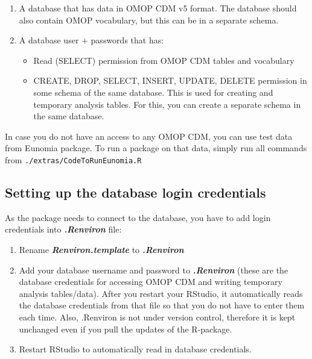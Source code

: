 \documentclass[
]{article}
\providecommand{\tightlist}{%
  \setlength{\itemsep}{0pt}\setlength{\parskip}{0pt}}
\begin{document}
\begin{enumerate}
\def\labelenumi{\arabic{enumi}.}
\tightlist
\item
  A database that has data in OMOP CDM v5 format. The database should
  also contain OMOP vocabulary, but this can be in a separate schema.
\item
  A database user + passwords that has:

  \begin{itemize}
  \tightlist
  \item
    Read (SELECT) permission from OMOP CDM tables and vocabulary
  \item
    CREATE, DROP, SELECT, INSERT, UPDATE, DELETE permission in some
    schema of the same database. This is used for creating and temporary
    analysis tables. For this, you can create a separate schema in the
    same database.
  \end{itemize}
\end{enumerate}

In case you do not have an access to any OMOP CDM, you can use test data
from Eunomia package. To run a package on that data, simply run all
commands from \texttt{./extras/CodeToRunEunomia.R}

\hypertarget{setting-up-the-database-login-credentials}{%
\subsection{Setting up the database login
credentials}\label{setting-up-the-database-login-credentials}}

As the package needs to connect to the database, you have to add login
credentials into \textbf{\emph{.Renviron}} file:

\begin{enumerate}
\def\labelenumi{\arabic{enumi}.}
\tightlist
\item
  Rename \textbf{\emph{Renviron.template}} to \textbf{\emph{.Renviron}}
\item
  Add your database username and password to \textbf{\emph{.Renviron}}
  (these are the database credentials for accessing OMOP CDM and writing
  temporary analysis tables/data). After you restart your RStudio, it
  automatically reads the database credentials from that file so that
  you do not have to enter them each time. Also, .Renviron is not under
  version control, therefore it is kept unchanged even if you pull the
  updates of the R-package.
\item
  Restart RStudio to automatically read in database credentials.
\end{enumerate}
\end{document}
